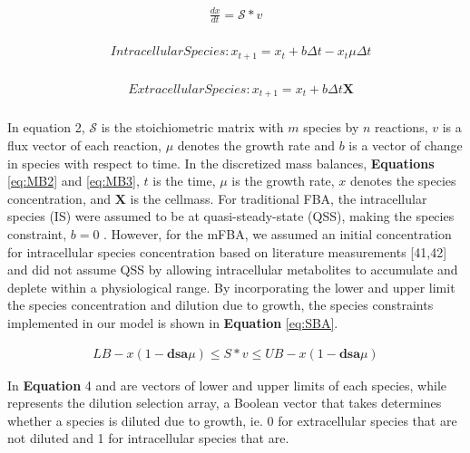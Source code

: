 \documentclass[12pt]{article}
\begin{document}
\begin{equation}\label{eq:MB1}
\begin{aligned}
\frac{dx}{dt}= \mathcal{S}* v \\
\end{aligned}
\end{equation}

\begin{equation}\label{eq:MB2}
\begin{aligned}
&Intracellular Species: x_{t+1} = x_t + b\Delta t - x_t \mu \Delta t\\
\end{aligned}
\end{equation}

\begin{equation}\label{eq:MB3}
\begin{aligned}
&Extracellular Species: x_{t+1} = x_t + b\Delta t \mathbf{X}\\
\end{aligned}
\end{equation}



In equation 2, $\mathcal{S}$ is the stoichiometric matrix with $m$ species by $n$ reactions, $v$ is a flux vector of each reaction, $\mu$ denotes the growth rate and $b$ is a vector of change in species with respect to time. In the discretized mass balances, \textbf{Equations} \eqref{eq:MB2} and \eqref{eq:MB3}, $t$ is the time, $\mu$ is the growth rate, $x$ denotes the species concentration, and $\mathbf{X}$ is the cellmass. For traditional FBA, the intracellular species (IS) were assumed to be at quasi-steady-state (QSS), making the species constraint, $b=0$ . However, for the mFBA, we assumed an initial concentration for intracellular species concentration based on literature measurements [41,42] and did not assume QSS by allowing intracellular metabolites to accumulate and deplete within a physiological range. By incorporating the lower and upper limit the species concentration and dilution due to growth, the species constraints implemented in our model is shown in \textbf{Equation} \eqref{eq:SBA}. 

\begin{equation}\label{eq:SBA}
\begin{aligned}
LB - x(1-\mathbf{dsa}\mu)\le S*v \le UB - x(1-\mathbf{dsa}\mu)
\end{aligned}
\end{equation}


In \textbf{Equation} 4  and  are vectors of lower and upper limits of each species, while  represents the dilution selection array, a Boolean vector that takes determines whether a species is diluted due to growth, ie. 0 for extracellular species that are not diluted and 1 for intracellular species that are.
\end{document}
